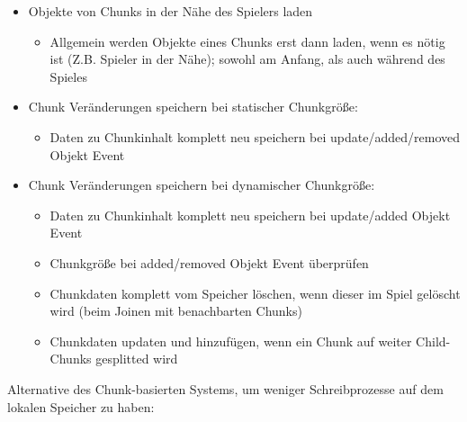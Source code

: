 \begin{itemize}
    \item Objekte von Chunks in der Nähe des Spielers laden
    \begin{itemize}
        \item Allgemein werden Objekte eines Chunks erst dann laden, wenn es nötig ist (Z.B. Spieler in der Nähe); sowohl am Anfang, als auch während des Spieles
    \end{itemize}
    \item Chunk Veränderungen speichern bei statischer Chunkgröße:
    \begin{itemize}
        \item Daten zu Chunkinhalt komplett neu speichern bei update/added/removed Objekt Event
    \end{itemize}
    \item Chunk Veränderungen speichern bei dynamischer Chunkgröße:
    \begin{itemize}
        \item Daten zu Chunkinhalt komplett neu speichern bei update/added Objekt Event 
        \item Chunkgröße bei added/removed Objekt Event überprüfen
        \item Chunkdaten komplett vom Speicher löschen, wenn dieser im Spiel gelöscht wird (beim Joinen mit benachbarten Chunks)
        \item Chunkdaten updaten und hinzufügen, wenn ein Chunk auf weiter Child-Chunks gesplitted wird
    \end{itemize}
\end{itemize}

Alternative des Chunk-basierten Systems, um weniger Schreibprozesse auf dem lokalen Speicher zu haben:

